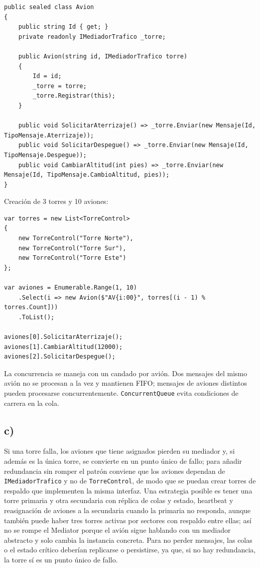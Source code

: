 \documentclass[11pt,a4paper]{article}
\begin{document}
\begin{lstlisting}
public sealed class Avion
{
    public string Id { get; }
    private readonly IMediadorTrafico _torre;

    public Avion(string id, IMediadorTrafico torre)
    {
        Id = id;
        _torre = torre;
        _torre.Registrar(this);
    }

    public void SolicitarAterrizaje() => _torre.Enviar(new Mensaje(Id, TipoMensaje.Aterrizaje));
    public void SolicitarDespegue() => _torre.Enviar(new Mensaje(Id, TipoMensaje.Despegue));
    public void CambiarAltitud(int pies) => _torre.Enviar(new Mensaje(Id, TipoMensaje.CambioAltitud, pies));
}
\end{lstlisting}

Creación de 3 torres y 10 aviones:

\begin{lstlisting}
var torres = new List<TorreControl>
{
    new TorreControl("Torre Norte"),
    new TorreControl("Torre Sur"),
    new TorreControl("Torre Este")
};

var aviones = Enumerable.Range(1, 10)
    .Select(i => new Avion($"AV{i:00}", torres[(i - 1) % torres.Count]))
    .ToList();

aviones[0].SolicitarAterrizaje();
aviones[1].CambiarAltitud(12000);
aviones[2].SolicitarDespegue();
\end{lstlisting}

La concurrencia se maneja con un candado por avión. Dos mensajes del mismo avión no se procesan a la vez y mantienen FIFO; mensajes de aviones distintos pueden procesarse concurrentemente. \texttt{ConcurrentQueue} evita condiciones de carrera en la cola.

\subsection*{c)}

Si una torre falla, los aviones que tiene asignados pierden su mediador y, si además es la única torre, se convierte en un punto único de fallo; para añadir redundancia sin romper el patrón conviene que los aviones dependan de \texttt{IMediadorTrafico} y no de \texttt{TorreControl}, de modo que se puedan crear torres de respaldo que implementen la misma interfaz. Una estrategia posible es tener una torre primaria y otra secundaria con réplica de colas y estado, heartbeat y reasignación de aviones a la secundaria cuando la primaria no responda, aunque también puede haber tres torres activas por sectores con respaldo entre ellas; así no se rompe el Mediator porque el avión sigue hablando con un mediador abstracto y solo cambia la instancia concreta. Para no perder mensajes, las colas o el estado crítico deberían replicarse o persistirse, ya que, si no hay redundancia, la torre sí es un punto único de fallo.
\end{document}
